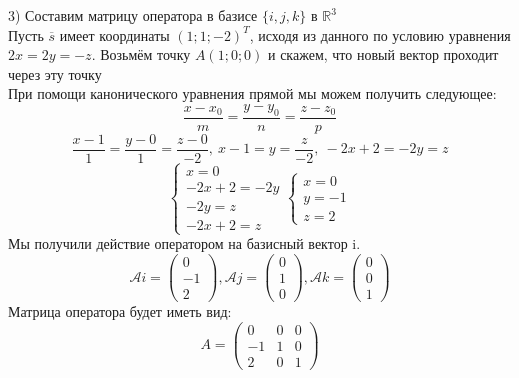 \documentclass{article}
\begin{document}
    3) Составим матрицу оператора в базисе $\{i,j,k\}$ в $\mathbb{R}^3$\\
    Пусть $\overline{s}$ имеет координаты $(1; 1; -2)^T$, исходя из данного по условию уравнения $2x=2y=-z$. Возьмём точку $A(1; 0; 0)$ и скажем, что новый вектор проходит через эту точку\\
    При помощи канонического уравнения прямой мы можем получить следующее:
    \begin{equation*}
        \frac{x-x_0}{m}=\frac{y-y_0}{n}=\frac{z-z_0}{p}
    \end{equation*}
    \begin{equation*}
        \frac{x-1}{1}=\frac{y-0}{1}=\frac{z-0}{-2},\ x-1=y=\frac{z}{-2},\ -2x+2=-2y=z
    \end{equation*}
    \begin{equation*}
        \begin{cases}
            x=0\\
            -2x+2=-2y\\
            -2y=z\\
            -2x+2=z
        \end{cases}
        \begin{cases}
            x=0\\
            y=-1\\
            z=2
        \end{cases}
    \end{equation*}
Мы получили действие оператором на базисный вектор i.\\
    \begin{equation*}
        \mathcal{A} i = 
    \begin{pmatrix}
        0 \\
        -1\\
        2
    \end{pmatrix}, 
    \mathcal{A} j = 
    \begin{pmatrix}
        0 \\
        1\\
        0
    \end{pmatrix}
    , 
    \mathcal{A} k = 
    \begin{pmatrix}
        0 \\
        0\\
        1
    \end{pmatrix}
    \end{equation*}
    Матрица оператора будет иметь вид:\\
    \begin{equation*}
    A = 
    \begin{pmatrix}
        0&0&0 \\
        -1&1&0\\
        2&0&1
    \end{pmatrix}
    \end{equation*}
\end{document}
